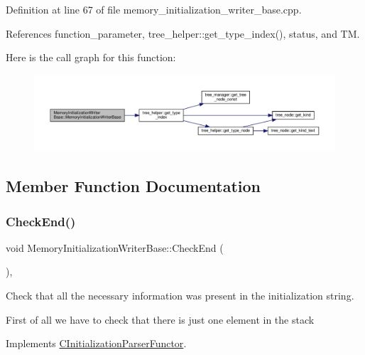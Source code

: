 Definition at line 67 of file memory\+\_\+initialization\+\_\+writer\+\_\+base.\+cpp.



References function\+\_\+parameter, tree\+\_\+helper\+::get\+\_\+type\+\_\+index(), status, and TM.

Here is the call graph for this function\+:
\nopagebreak
\begin{figure}[H]
\begin{center}
\leavevmode
\includegraphics[width=350pt]{d3/d26/classMemoryInitializationWriterBase_aecfe363b2187038fe689abceacb2343a_cgraph}
\end{center}
\end{figure}


\subsection{Member Function Documentation}
\mbox{\label{classMemoryInitializationWriterBase_a33b7ee7cf9c476b02a3f6fb1e6e22a25}} 
\subsubsection{\texorpdfstring{Check\+End()}{CheckEnd()}}
{\footnotesize\ttfamily void Memory\+Initialization\+Writer\+Base\+::\+Check\+End (\begin{DoxyParamCaption}{ }\end{DoxyParamCaption})\hspace{0.3cm}{\ttfamily [override]}, {\ttfamily [virtual]}}



Check that all the necessary information was present in the initialization string. 

First of all we have to check that there is just one element in the stack 

Implements \hyperlink{classCInitializationParserFunctor_aa639277133d141fd3aeed2add158c920}{C\+Initialization\+Parser\+Functor}.



